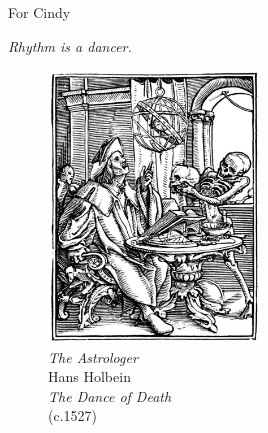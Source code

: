 
\noindent For Cindy

\vspace{\baselineskip}

\noindent \emph{Rhythm is a dancer.}

\begin{figure}
    \vspace{50pt}
    \centering
    \includegraphics[width=0.50\textwidth]{assets/holbein-astrologer.jpg}
    \\
    \emph{The Astrologer}
    \\
    Hans Holbein
    \\
    \emph{The Dance of Death}
    \\
    (c.1527)
\end{figure}